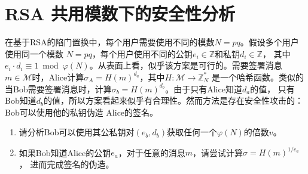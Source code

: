 \section{RSA 共用模数下的安全性分析}

在基于RSA的陷门置换中，每个用户需要使用不同的模数$N=pq$。假设多个用户使用同一个模数
$N=pq$，每个用户使用不同的公钥$e_i\in \mathbb{Z}$和私钥$d_i \in \mathbb{Z}$，
其中$e_i\cdot d_i \equiv 1 \bmod \varphi(N)$。从表面上看，似乎该方案是可行的。需要签署消息
$m \in \mathcal{M}$时，Alice计算$\sigma_A=H(m)^{d_a}$，其中$H:\mathcal{M}\rightarrow \mathbb{Z}_N^*$
是一个哈希函数。类似的当Bob需要签署消息时，计算$\sigma_b = H(m)^{d_b}$。由于只有Alice知道$d_a$的值，
只有Bob知道$d_b$的值，所以方案看起来似乎有合理性。然而方法是存在安全性攻击的：Bob可以使用他的私钥伪造
Alice的签名。

\begin{enumerate}
    \item 请分析Bob可以使用其公私钥对$(e_b,d_b)$获取任何一个$\varphi(N)$的倍数$v$。
    \item 如果Bob知道Alice的公钥$e_a$，对于任意的消息$m$，请尝试计算$\sigma = H(m)^{1/e_a}$，
    进而完成签名的伪造。
\end{enumerate}

